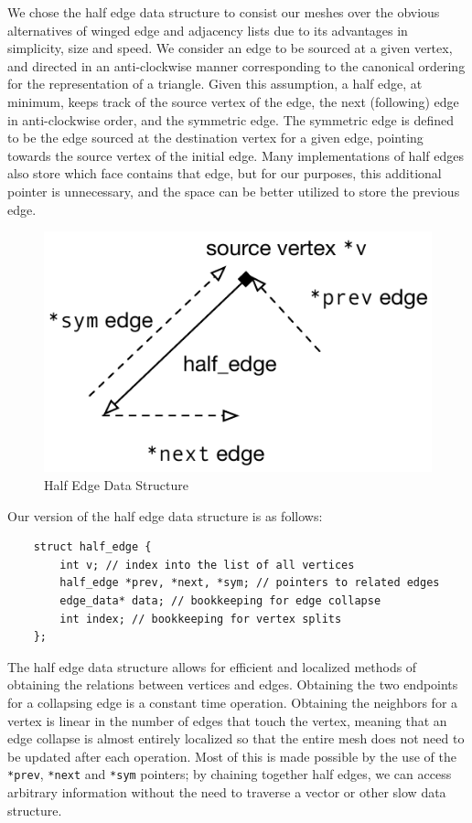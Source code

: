 \documentclass[11pt]{article}
\begin{document}
We chose the half edge data structure to consist our meshes over the obvious
alternatives of winged edge and adjacency lists due to its advantages in
simplicity, size and speed. We consider an edge to be sourced at a given
vertex, and directed in an anti-clockwise manner corresponding to the canonical
ordering for the representation of a triangle. Given this assumption, a half
edge, at minimum, keeps track of the source vertex of the edge, the next
(following) edge in anti-clockwise order, and the symmetric edge. The symmetric
edge is defined to be the edge sourced at the destination vertex for a given
edge, pointing towards the source vertex of the initial edge. Many
implementations of half edges also store which face contains that edge, but for
our purposes, this additional pointer is unnecessary, and the space can be
better utilized to store the previous edge.

\begin{figure}[htb]
\begin{center}
  \includegraphics{figs/half_edge-data-structure}
\end{center}
\caption{Half Edge Data Structure}
\end{figure}


Our version of the half edge data structure is as follows:

\begin{verbatim}
    struct half_edge {
        int v; // index into the list of all vertices
        half_edge *prev, *next, *sym; // pointers to related edges
        edge_data* data; // bookkeeping for edge collapse
        int index; // bookkeeping for vertex splits
    };
\end{verbatim}

The half edge data structure allows for efficient and localized methods of
obtaining the relations between vertices and edges. Obtaining the two endpoints
for a collapsing edge is a constant time operation.  Obtaining the neighbors
for a vertex is linear in the number of edges that touch the vertex, meaning
that an edge collapse is almost entirely localized so that the entire mesh does
not need to be updated after each operation. Most of this is made possible by
the use of the \verb`*prev`, \verb`*next` and \verb`*sym` pointers; by chaining
together half edges, we can access arbitrary information without the need to
traverse a vector or other slow data structure.
\end{document}
